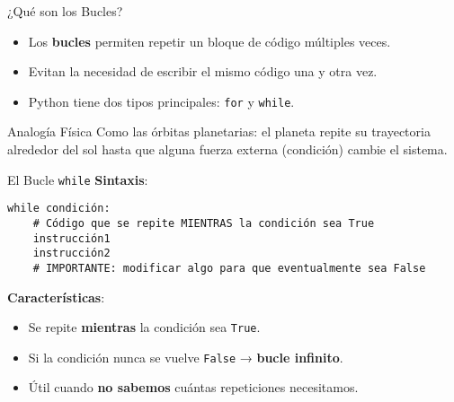 \documentclass[10pt]{beamer}
\begin{document}
\begin{frame}{¿Qué son los Bucles?}
  \begin{itemize}
    \item Los \textbf{bucles} permiten repetir un bloque de código múltiples veces.
    \item Evitan la necesidad de escribir el mismo código una y otra vez.
    \item Python tiene dos tipos principales: \texttt{for} y \texttt{while}.
  \end{itemize}
  
  \begin{block}{Analogía Física}
    Como las órbitas planetarias: el planeta repite su trayectoria alrededor del sol hasta que alguna fuerza externa (condición) cambie el sistema.
  \end{block}
\end{frame}

\begin{frame}[fragile]{El Bucle \texttt{while}}
  \textbf{Sintaxis}:
  \begin{verbatim}
while condición:
    # Código que se repite MIENTRAS la condición sea True
    instrucción1
    instrucción2
    # IMPORTANTE: modificar algo para que eventualmente sea False
  \end{verbatim}
  
  \textbf{Características}:
  \begin{itemize}
    \item Se repite \textbf{mientras} la condición sea \texttt{True}.
    \item Si la condición nunca se vuelve \texttt{False} → \textbf{bucle infinito}.
    \item Útil cuando \textbf{no sabemos} cuántas repeticiones necesitamos.
  \end{itemize}
\end{frame}


\end{document}
